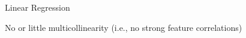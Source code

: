 \documentclass[10pt,compress,t,notes=noshow,xcolor=table]{beamer}
\begin{document}
\begin{framev}[align=top]{Linear Regression}
\begin{itemizeM}
\item<+-> No or little multicollinearity (i.e., no strong feature correlations)
\end{itemizeM}
\end{framev}

\end{document}
